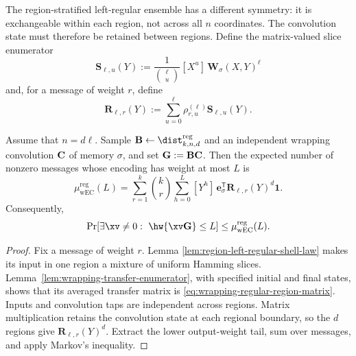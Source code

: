 The region-stratified left-regular ensemble has a different symmetry: it is
exchangeable within each region, not across all $n$ coordinates.  The
convolution state must therefore be retained between regions.  Define the
matrix-valued slice enumerator
\begin{equation}
 \mathbf S_{\ell,u}(Y)
 :=\frac{1}{\binom{\ell}{u}}[X^u]\,
      \mathbf W_\sigma(X,Y)^\ell
 \label{eq:wrapping-region-slice-matrix}
\end{equation}
and, for a message of weight $r$, define
\begin{equation}
 \mathbf R_{\ell,r}(Y)
 :=\sum_{u=0}^{\ell}\rho^{(\ell)}_{r,u}
      \mathbf S_{\ell,u}(Y).
 \label{eq:wrapping-regular-region-matrix}
\end{equation}

\begin{theorem}
\label{thm:wrapping-regular-first-moment}
Assume that $n=d\ell$.  Sample
$\B\gets\dist^{\mathrm{reg}}_{k,n,d}$ and an independent wrapping convolution
$\mathbf C$ of memory $\sigma$, and set $\mathbf G:=\mathbf B\mathbf C$.  Then the expected number of
nonzero messages whose encoding has weight at most $L$ is
\begin{equation}
 \boxed{
 \mu_{\mathrm{wEC}}^{\mathrm{reg}}(L)
 =\sum_{r=1}^{k}\binom{k}{r}\sum_{h=0}^{L}[Y^h]\,
   \mathbf e_\sigma^\mathsf{T}
   \mathbf R_{\ell,r}(Y)^d\mathbf 1.
 }
 \label{eq:wrapping-regular-first-moment}
\end{equation}
Consequently,
\begin{equation}
 \Pr[\exists\xv\ne0:\ \hw{\xv\G}\leq L]
 \leq\mu_{\mathrm{wEC}}^{\mathrm{reg}}(L).
 \label{eq:wrapping-regular-failure}
\end{equation}
\end{theorem}

\begin{proof}
Fix a message of weight $r$.  Lemma
\ref{lem:region-left-regular-shell-law} makes its input in one region a mixture
of uniform Hamming slices.  Lemma~\ref{lem:wrapping-transfer-enumerator}, with
specified initial and final states, shows that its averaged transfer matrix is
\eqref{eq:wrapping-regular-region-matrix}.  Inputs and convolution taps are
independent across regions.  Matrix multiplication retains the convolution
state at each regional boundary, so the $d$ regions give
$\mathbf R_{\ell,r}(Y)^d$.  Extract the lower output-weight tail, sum over
messages, and apply Markov's inequality.
\end{proof}

